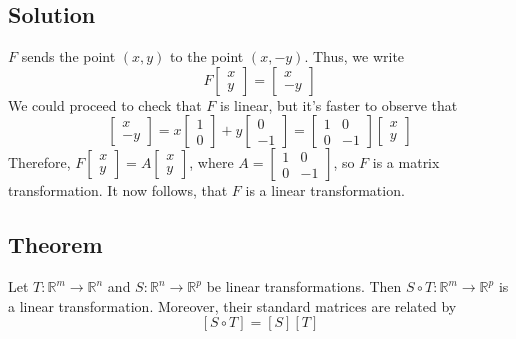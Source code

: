 \subsection*{Solution}
$F$ sends the point $(x,y)$ to the point $(x,-y)$. Thus, we write
\[
    F\begin{bmatrix}
        x \\y
    \end{bmatrix}=\begin{bmatrix}
        x \\-y
    \end{bmatrix}
\]
We could proceed to check that $F$ is linear, but it's faster to observe that
\[
    \begin{bmatrix}
        x \\-y
    \end{bmatrix}=x\begin{bmatrix}
        1 \\0
    \end{bmatrix}+y\begin{bmatrix}
        0 \\-1
    \end{bmatrix}=\begin{bmatrix}
        1 & 0  \\
        0 & -1
    \end{bmatrix}\begin{bmatrix}
        x \\y
    \end{bmatrix}
\]
Therefore, $F\begin{bmatrix}
        x \\y
    \end{bmatrix}=A\begin{bmatrix}
        x \\y
    \end{bmatrix}$, where $A=\begin{bmatrix}
        1 & 0  \\
        0 & -1
    \end{bmatrix}$, so $F$ is a matrix transformation. It now follows, that $F$ is a linear transformation.

\subsection*{Theorem}
Let $T:\mathbb{R}^m\to\mathbb{R}^n$ and $S:\mathbb{R}^n\to\mathbb{R}^p$ be linear transformations.
Then $S\circ T:\mathbb{R}^m\to\mathbb{R}^p$ is a linear transformation. Moreover, their
standard matrices are related by
\[
    [S\circ T]=[S][T]
\]

